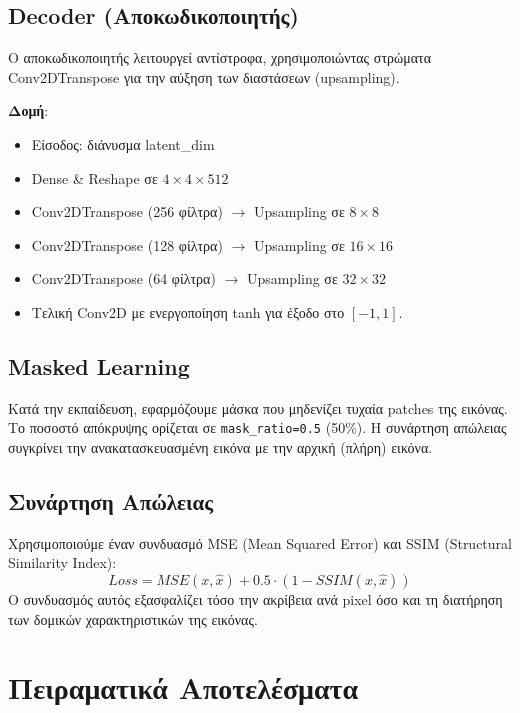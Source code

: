 \documentclass[11pt,a4paper]{article}
\begin{document}
\subsection{Decoder (Αποκωδικοποιητής)}
Ο αποκωδικοποιητής λειτουργεί αντίστροφα, χρησιμοποιώντας στρώματα \textenglish{Conv2DTranspose} για την αύξηση των διαστάσεων (upsampling).

\textbf{Δομή}:
\begin{itemize}
    \item Είσοδος: διάνυσμα \textenglish{latent\_dim}
    \item \textenglish{Dense} \& \textenglish{Reshape} σε $4 \times 4 \times 512$
    \item \textenglish{Conv2DTranspose} (256 φίλτρα) $\rightarrow$ Upsampling σε $8 \times 8$
    \item \textenglish{Conv2DTranspose} (128 φίλτρα) $\rightarrow$ Upsampling σε $16 \times 16$
    \item \textenglish{Conv2DTranspose} (64 φίλτρα) $\rightarrow$ Upsampling σε $32 \times 32$
    \item Τελική \textenglish{Conv2D} με ενεργοποίηση \textenglish{tanh} για έξοδο στο $[-1, 1]$.
\end{itemize}

\subsection{Masked Learning}
Κατά την εκπαίδευση, εφαρμόζουμε μάσκα που μηδενίζει τυχαία patches της εικόνας.
Το ποσοστό απόκρυψης ορίζεται σε \textenglish{\texttt{mask\_ratio=0.5}} (50\%).
Η συνάρτηση απώλειας συγκρίνει την ανακατασκευασμένη εικόνα με την αρχική (πλήρη) εικόνα.

\subsection{Συνάρτηση Απώλειας}
Χρησιμοποιούμε έναν συνδυασμό \textenglish{MSE} \textenglish{(Mean Squared Error)} και
\textenglish{SSIM} \textenglish{(Structural Similarity Index)}:
\begin{equation}
    Loss = MSE(x, \hat{x}) + 0.5 \cdot (1 - SSIM(x, \hat{x}))
\end{equation}
Ο συνδυασμός αυτός εξασφαλίζει τόσο την ακρίβεια ανά pixel όσο και τη διατήρηση των δομικών χαρακτηριστικών της εικόνας.

\newpage

\section{Πειραματικά Αποτελέσματα}
\end{document}
